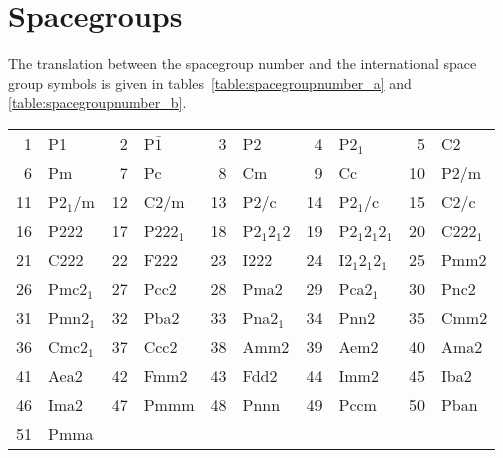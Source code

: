 \documentclass[11pt,a4paper]{report}
\begin{document}
\section{Spacegroups}
The translation between the spacegroup number and the international
space group symbols is given in tables~\ref{table:spacegroupnumber_a}
and \ref{table:spacegroupnumber_b}.
\begin{table}[h!]
\begin{center}
\begin{tabular}{||r|l||r|l||r|l||r|l||r|l||}
\hline
1      & P1                 & 
2      & P$\bar{1}$         & 
3      & P2                 & 
4      & P2$_1$             & 
5      & C2                 \\
6      & Pm                 & 
7      & Pc                 & 
8      & Cm                 & 
9      & Cc                 & 
10     & P2/m               \\
11     & P2$_1$/m           & 
12     & C2/m               & 
13     & P2/c               & 
14     & P2$_1$/c           & 
15     & C2/c               \\
16     & P222               & 
17     & P222$_1$           & 
18     & P2$_1$2$_1$2       & 
19     & P2$_1$2$_1$2$_1$   & 
20     & C222$_1$           \\
21     & C222               & 
22     & F222               & 
23     & I222               & 
24     & I2$_1$2$_1$2$_1$   & 
25     & Pmm2               \\
26     & Pmc2$_1$           & 
27     & Pcc2               & 
28     & Pma2               & 
29     & Pca2$_1$           & 
30     & Pnc2               \\
31     & Pmn2$_1$           & 
32     & Pba2               & 
33     & Pna2$_1$           & 
34     & Pnn2               & 
35     & Cmm2               \\
36     & Cmc2$_1$           & 
37     & Ccc2               & 
38     & Amm2               & 
39     & Aem2               & 
40     & Ama2               \\
41     & Aea2               & 
42     & Fmm2               & 
43     & Fdd2               & 
44     & Imm2               & 
45     & Iba2               \\
46     & Ima2               & 
47     & Pmmm               & 
48     & Pnnn               & 
49     & Pccm               & 
50     & Pban               \\
51     & Pmma               & 

\end{tabular}
\end{center}
\end{table}
\end{document}
